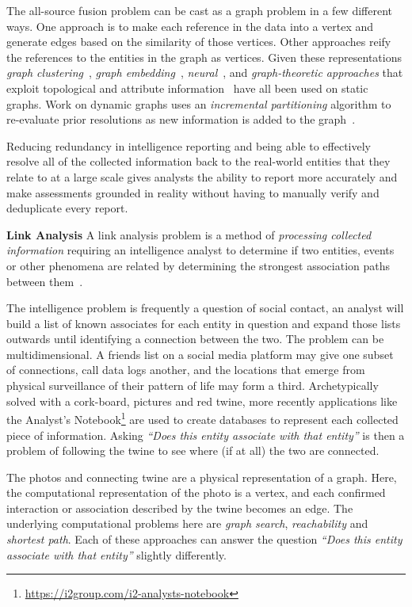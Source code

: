 The all-source fusion problem can be cast as a graph problem in a few different ways. 
One approach is to make each reference in the data into a vertex and generate edges based on the similarity of those vertices. 
Other approaches reify the references to the entities in the graph as vertices.
Given these representations \textit{graph clustering}~\cite{Bhattacharya2006}, \textit{graph embedding}~\cite{Obraczka2021}, \textit{neural}~\cite{Ebraheem2018}, and \textit{graph-theoretic approaches} that exploit topological and attribute information~\cite{Zhang2020} have all been used on static graphs.
Work on dynamic graphs uses an \textit{incremental partitioning} algorithm to re-evaluate prior resolutions as new information is added to the graph~\cite{Tauer2019}.

Reducing redundancy in intelligence reporting and being able to effectively resolve all of the collected information back to the real-world entities that they relate to at a large scale gives analysts the ability to report more accurately and make assessments grounded in reality without having to manually verify and deduplicate every report. 

\textbf{Link Analysis}
A link analysis problem is a method of \textit{processing collected information} requiring an intelligence analyst to determine if two entities, events or other phenomena are related by determining the strongest association paths between them~\cite{Xu2004}.

The intelligence problem is frequently a question of social contact, an analyst will build a list of known associates for each entity in question and expand those lists outwards until identifying a connection between the two. 
The problem can be multidimensional.
A friends list on a social media platform may give one subset of connections, call data logs another, and the locations that emerge from physical surveillance of their pattern of life may form a third. 
Archetypically solved with a cork-board, pictures and red twine, more recently applications like the Analyst's Notebook\footnote{\url{https://i2group.com/i2-analysts-notebook}} are used to create databases to represent each collected piece of information.
Asking \textit{``Does this entity associate with that entity''} is then a problem of following the twine to see where (if at all) the two are connected. 

The photos and connecting twine are a physical representation of a graph. 
Here, the computational representation of the photo is a vertex, and each confirmed interaction or association described by the twine becomes an edge. 
The underlying computational problems here are \textit{graph search}, \textit{reachability} and \textit{shortest path}. 
Each of these approaches can answer the question \textit{``Does this entity associate with that entity''} slightly differently.

